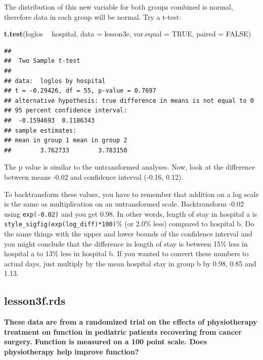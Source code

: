\documentclass[]{book}
\newenvironment{Shaded}{\begin{snugshade}}{\end{snugshade}}
\newcommand{\DataTypeTok}[1]{\textcolor[rgb]{0.13,0.29,0.53}{#1}}
\newcommand{\KeywordTok}[1]{\textcolor[rgb]{0.13,0.29,0.53}{\textbf{#1}}}
\newcommand{\NormalTok}[1]{#1}
\newcommand{\OperatorTok}[1]{\textcolor[rgb]{0.81,0.36,0.00}{\textbf{#1}}}
\newcommand{\OtherTok}[1]{\textcolor[rgb]{0.56,0.35,0.01}{#1}}
\newcommand{\StringTok}[1]{\textcolor[rgb]{0.31,0.60,0.02}{#1}}
\begin{document}
The distribution of this new variable for both groups combined is normal, therefore data in each group will be normal. Try a t-test:

\begin{Shaded}
\begin{Highlighting}[]
\KeywordTok{t.test}\NormalTok{(loglos }\OperatorTok{~}\StringTok{ }\NormalTok{hospital, }\DataTypeTok{data =}\NormalTok{ lesson3e, }\DataTypeTok{var.equal =} \OtherTok{TRUE}\NormalTok{, }\DataTypeTok{paired =} \OtherTok{FALSE}\NormalTok{)}
\end{Highlighting}
\end{Shaded}

\begin{verbatim}
## 
##  Two Sample t-test
## 
## data:  loglos by hospital
## t = -0.29426, df = 55, p-value = 0.7697
## alternative hypothesis: true difference in means is not equal to 0
## 95 percent confidence interval:
##  -0.1594693  0.1186343
## sample estimates:
## mean in group 1 mean in group 2 
##        3.762733        3.783150
\end{verbatim}

The p value is similar to the untransformed analyses. Now, look at the difference between means -0.02 and confidence interval (-0.16, 0.12).

To backtransform these values, you have to remember that addition on a log scale is the same as multiplication on an untransformed scale. Backtransform -0.02 using \texttt{exp(-0.02)} and you get 0.98. In other words, length of stay in hospital a is \texttt{style\_sigfig(exp(log\_diff)*100)}\% (or 2.0\% less) compared to hospital b. Do the same things with the upper and lower bounds of the confidence interval and you might conclude that the difference in length of stay is between 15\% less in hospital a to 13\% less in hospital b. If you wanted to convert these numbers to actual days, just multiply by the mean hospital stay in group b by 0.98, 0.85 and 1.13.

\hypertarget{lesson3f.rds}{%
\subsection{lesson3f.rds}\label{lesson3f.rds}}

\textbf{These data are from a randomized trial on the effects of physiotherapy treatment on function in pediatric patients recovering from cancer surgery. Function is measured on a 100 point scale. Does physiotherapy help improve function?}
\end{document}
